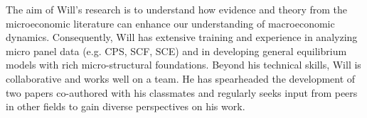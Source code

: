 \documentclass[\econtexRoot/Letter]{subfiles}
\begin{document}




The aim of Will's research is to understand how evidence and theory from the microeconomic literature can enhance our understanding of macroeconomic dynamics. Consequently, Will has extensive training and experience in analyzing micro panel data (e.g. CPS, SCF, SCE) and in developing general equilibrium models with rich micro-structural foundations. Beyond his technical skills, Will is collaborative and works well on a team. He has spearheaded the development of two papers co-authored with his classmates and regularly seeks input from peers in other fields to gain diverse perspectives on his work.

\onlyinsubfile{}

  \onlyinsubfile{\captionsetup[figure]{list=no}}
  \onlyinsubfile{\captionsetup[table]{list=no}}
  
\end{document}
